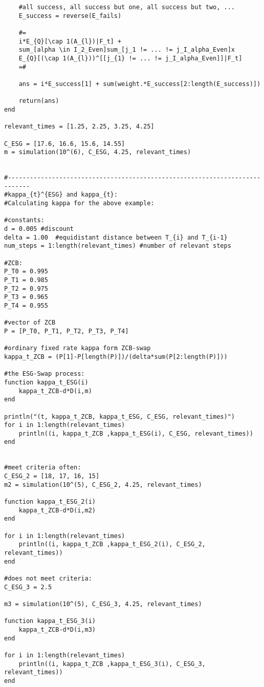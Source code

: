 \begin{verbatim}
    #all success, all success but one, all success but two, ... 
    E_success = reverse(E_fails)
    
    #=
    i*E_{Q}[\cap 1(A_{l})|F_t] + 
    sum_[alpha \in I_2_Even]sum_[j_1 != ... != j_I_alpha_Even]x
    E_{Q}[(\cap 1(A_{l}))^[[j_{1} != ... != j_I_alpha_Even]]|F_t] 
    =#

    ans = i*E_success[1] + sum(weight.*E_success[2:length(E_success)])

    return(ans)
end

relevant_times = [1.25, 2.25, 3.25, 4.25]

C_ESG = [17.6, 16.6, 15.6, 14.55]
m = simulation(10^(6), C_ESG, 4.25, relevant_times)


#----------------------------------------------------------------------------
#kappa_{t}^{ESG} and kappa_{t}: 
#Calculating kappa for the above example:

#constants:
d = 0.005 #discount
delta = 1.00  #equidistant distance between T_{i} and T_{i-1}
num_steps = 1:length(relevant_times) #number of relevant steps

#ZCB:
P_T0 = 0.995
P_T1 = 0.985
P_T2 = 0.975
P_T3 = 0.965
P_T4 = 0.955

#vector of ZCB
P = [P_T0, P_T1, P_T2, P_T3, P_T4] 

#ordinary fixed rate kappa form ZCB-swap
kappa_t_ZCB = (P[1]-P[length(P)])/(delta*sum(P[2:length(P)]))

#the ESG-Swap process:
function kappa_t_ESG(i)
    kappa_t_ZCB-d*D(i,m)
end

println("(t, kappa_t_ZCB, kappa_t_ESG, C_ESG, relevant_times)")
for i in 1:length(relevant_times)
    println((i, kappa_t_ZCB ,kappa_t_ESG(i), C_ESG, relevant_times))
end


#meet criteria often:  
C_ESG_2 = [18, 17, 16, 15]
m2 = simulation(10^(5), C_ESG_2, 4.25, relevant_times)

function kappa_t_ESG_2(i)
    kappa_t_ZCB-d*D(i,m2)
end

for i in 1:length(relevant_times)
    println((i, kappa_t_ZCB ,kappa_t_ESG_2(i), C_ESG_2, relevant_times))
end

#does not meet criteria: 
C_ESG_3 = 2.5

m3 = simulation(10^(5), C_ESG_3, 4.25, relevant_times)

function kappa_t_ESG_3(i)
    kappa_t_ZCB-d*D(i,m3)
end

for i in 1:length(relevant_times)
    println((i, kappa_t_ZCB ,kappa_t_ESG_3(i), C_ESG_3, relevant_times))
end


\end{verbatim}


%


%


